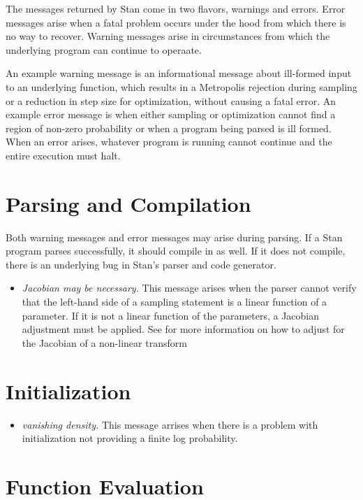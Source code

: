 The messages returned by Stan come in two flavors, warnings and
errors.  Error messages arise when a fatal problem occurs under the
hood from which there is no way to recover.  Warning messages arise
in circumstances from which the underlying program can continue to
operaate.  

An example warning message is an informational message about
ill-formed input to an underlying function, which results in a
Metropolis rejection during sampling or a reduction in step size for
optimization, without causing a fatal error.  An example error message
is when either sampling or optimization cannot find a region of
non-zero probability or when a program being parsed is ill formed.
When an error arises, whatever program is running cannot continue and
the entire execution must halt.

\section{Parsing and Compilation}

Both warning messages and error messages may arise during parsing.  If
a Stan program parses successfully, it should compile in \Cpp as
well.  If it does not compile, there is an underlying bug in Stan's
parser and \Cpp code generator.

\begin{itemize}
\item {\it Jacobian may be necessary.}  This message arises when the
  parser cannot verify that the left-hand side of a sampling statement
  is a linear function of a parameter.  If it is not a linear function
  of the parameters, a Jacobian adjustment must be applied.  See
   for more information on how to
  adjust for the Jacobian of a non-linear transform
\end{itemize}


\section{Initialization}

\begin{itemize}
\item {\it vanishing density.} This message arrises when there is a
  problem with initialization not providing a finite log probability.
%
\end{itemize}

\section{Function Evaluation}

